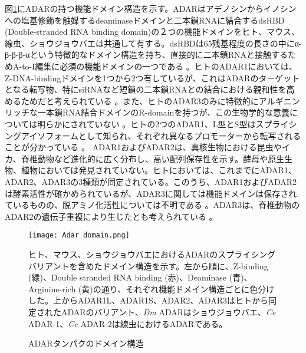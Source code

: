 図\ref{fig:adar_domain}にADARの持つ機能ドメイン構造を示す。ADARはアデノシンからイノシンへの塩基修飾を触媒するdeaminaseドメインと二本鎖RNAに結合するdsRBD (Double-stranded RNA binding domain)の２つの機能ドメインをヒト、マウス、線虫、ショウジョウバエは共通して有する。dsRBDは65残基程度の長さの中にα-β-β-β-αという特徴的なドメイン構造を持ち、直接的に二本鎖RNAと接触するためA-to-I編集に必須の機能ドメインの一つである \citep{Barraud:2012aa, ChoYanLee0305, LaiDraNis9507}。ヒトのADAR1においては、Z-DNA-bindingドメインを1つから2つ有しているが、これはADARのターゲットとなる転写物、特にsiRNAなど短鎖の二本鎖RNAとの結合における親和性を高めるためだと考えられている \citep{QiZhaQiu1205}。また、ヒトのADAR3のみに特徴的にアルギニンリッチな一本鎖RNA結合ドメインのR-domainを持つが、この生物学的な意義については明らかにされていない \citep{CheChoWan0005}。ヒトの2つのADAR1、L型とS型はスプライシングアイソフォームとして知られ、それぞれ異なるプロモーターから転写されることが分かっている \citep{KawSam0011}。
ADAR1およびADAR2は、真核生物における昆虫やイカ、脊椎動物など進化的に広く分布し、高い配列保存性を示す。酵母や原生生物、植物においては発見されていない。ヒトにおいては、これまでにADAR1、ADAR2、ADAR3の3種類が同定されている。このうち、ADAR1およびADAR2は酵素活性が確かめられているが、ADAR3に関しては機能ドメインは保存されているものの、脱アミノ化活性については不明である \citep{Nishikura:2006aa, MelMaaHer9612}。ADAR3は、脊椎動物のADAR2の遺伝子重複により生じたとも考えられている \citep{JinZhaLi0906}。

\begin{figure}[!h]
	\begin{center}
		\texttt{[image: Adar\_domain.png]}
	\end{center}
	\caption{ADARタンパクのドメイン構造}
	\begin{flushleft}
		\small{ヒト、マウス、ショウジョウバエにおけるADARのスプライシングバリアントを含めたドメイン構造を示す。左から順に、Z-binding (緑)、Double stranded RNA binding (赤)、Deaminase (青)、Arginine-rich (黄)の通り、それぞれ機能ドメイン構造ごとに色分けした。上からADAR1L、ADAR1S、ADAR2、ADAR3はヒトから同定されたADARのバリアント、\textit{Dm} ADARはショウジョウバエ、\textit{Ce} ADAR-1、\textit{Ce} ADAR-2は線虫におけるADARである。}
	\end{flushleft}
	\label{fig:adar_domain}
\end{figure}

